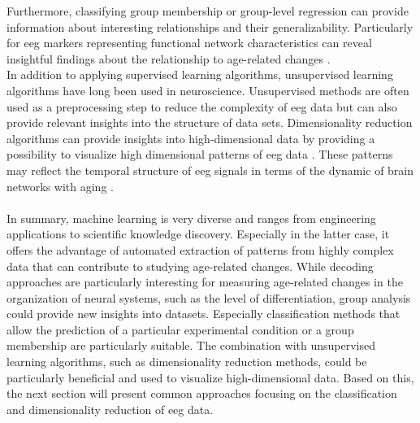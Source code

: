Furthermore, classifying group membership or group-level regression can provide information about interesting relationships and their generalizability. Particularly for \gls{eeg} markers representing functional network characteristics can reveal insightful findings about the relationship to age-related changes \cite{Petti2016}.\\
In addition to applying supervised learning algorithms, unsupervised learning algorithms have long been used in neuroscience. Unsupervised methods are often used as a preprocessing step to reduce the complexity of \gls{eeg} data but can also provide relevant insights into the structure of data sets. Dimensionality reduction algorithms can provide insights into high-dimensional data by providing a possibility to visualize high dimensional patterns of \gls{eeg} data \cite{Kottlarz2020, Banville2021}. These patterns may reflect the temporal structure of \gls{eeg} signals in terms of the dynamic of brain networks with aging \cite{Brunton2016, vieluf2018age}.\\
\\
In summary, machine learning is very diverse and ranges from engineering applications to scientific knowledge discovery. Especially in the latter case, it offers the advantage of automated extraction of patterns from highly complex data that can contribute to studying age-related changes. While decoding approaches are particularly interesting for measuring age-related changes in the organization of neural systems, such as the level of differentiation, group analysis could provide new insights into datasets. Especially classification methods that allow the prediction of a particular experimental condition or a group membership are particularly suitable. The combination with unsupervised learning algorithms, such as dimensionality reduction methods, could be particularly beneficial and used to visualize high-dimensional data. Based on this, the next section will present common approaches focusing on the classification and dimensionality reduction of \gls{eeg} data.


